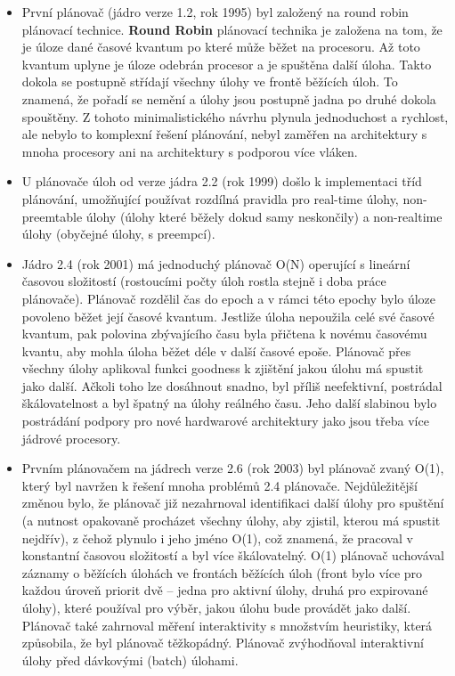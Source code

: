 \documentclass[
  master=true,
  font=sans,
  printversion=false,
  joinlists=true,
  figures=true,
  tables=true,
  sourcecodes=false,
  theorems=false,
  bibencoding=utf8,
  language=czech,
  encoding=utf8,
  field=ainfk,
  biblatex,
  glossaries,
  index
]{kidiplom}
\begin{document}
\begin{itemize}

\item První plánovač (jádro verze 1.2, rok 1995) byl založený na round robin plánovací technice. \textbf{Round Robin} plánovací technika je založena na tom, že je úloze dané časové kvantum po které může běžet na procesoru. Až toto kvantum uplyne je úloze odebrán procesor a je spuštěna další úloha. Takto dokola se postupně střídají všechny úlohy ve frontě běžících úloh. To znamená, že pořadí se nemění a úlohy jsou postupně jadna po druhé dokola spouštěny. Z tohoto minimalistického návrhu plynula jednoduchost a rychlost, ale nebylo to komplexní řešení plánování, nebyl zaměřen na architektury s mnoha procesory ani na architektury s podporou více vláken.

\item U plánovače úloh od verze jádra 2.2 (rok 1999) došlo k implementaci tříd plánování, umožňující používat rozdílná pravidla pro real-time úlohy, non-preemtable úlohy (úlohy které běžely dokud samy neskončily) a non-realtime úlohy (obyčejné úlohy, s preempcí).

\item Jádro 2.4 (rok 2001) má jednoduchý plánovač O(N) operující s lineární časovou složitostí (rostoucími počty úloh rostla stejně i doba práce plánovače). Plánovač rozdělil čas do epoch a v rámci této epochy bylo úloze povoleno běžet její časové kvantum. Jestliže úloha nepoužila celé své časové kvantum, pak polovina zbývajícího času byla přičtena k novému časovému kvantu, aby mohla úloha běžet déle v další časové epoše. Plánovač přes všechny úlohy aplikoval funkci goodness k zjištění jakou úlohu má spustit jako další. Ačkoli toho lze dosáhnout snadno, byl příliš neefektivní, postrádal škálovatelnost a byl špatný na úlohy reálného času. Jeho další slabinou bylo postrádání podpory pro nové hardwarové architektury jako jsou třeba více jádrové procesory. 

\item Prvním plánovačem na jádrech verze 2.6 (rok 2003) byl plánovač zvaný O(1), který byl navržen k řešení mnoha problémů 2.4 plánovače. \linebreak Nejdůležitější změnou bylo, že plánovač již nezahrnoval identifikaci další úlohy pro spuštění (a nutnost opakovaně procházet všechny úlohy, aby zjistil, kterou má spustit nejdřív), z čehož plynulo i jeho jméno O(1), což znamená, že pracoval v konstantní časovou složitostí a byl více škálovatelný. O(1) plánovač uchovával záznamy o běžících úlohách ve frontách běžících úloh (front bylo více pro každou úroveň priorit dvě – jedna pro aktivní úlohy, druhá pro expirované úlohy), které používal pro výběr, jakou úlohu bude provádět jako další. Plánovač také zahrnoval měření interaktivity s množstvím heuristiky, která způsobila, že byl plánovač těžkopádný. Plánovač zvýhodňoval interaktivní úlohy před dávkovými (batch) úlohami.

\end{itemize}
\end{document}
